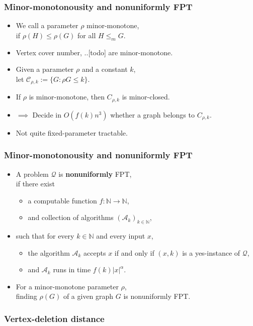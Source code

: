 \documentclass[t,usenames,dvipsnames]{beamer}
\begin{document}
\begin{frame} \frametitle{Minor-monotonousity and nonuniformly FPT}
	\begin{itemize}[<+->]
		\item We call a parameter $\rho$ minor-monotone,\\
			\hspace{1cm}if $\rho(H)\leq \rho(G)$ for all $H \leq_m G$.
		\item Vertex cover number, ..[todo] are minor-monotone.%
		\item Given a parameter $\rho$ and a constant $k$,\\
		\hspace{1cm}let $\mathcal{C}_{\rho, k} := \{G \colon \rho{G} \leq k\}$.
		\item If $\rho$ is minor-monotone, then $C_{\rho, k}$ is minor-closed.
		\item $\implies$ Decide in $O(f(k) n^3)$ whether a graph belongs to $C_{\rho, k}$.
		\item Not quite fixed-parameter tractable.
	\end{itemize}
\end{frame}
\begin{frame} \frametitle{Minor-monotonousity and nonuniformly FPT}
	\begin{itemize}[<+->]
		\item A problem $\mathcal{Q}$ is \textbf{nonuniformly} FPT,\\
			\hspace{1cm}if there exist
			\begin{itemize}
				\item a computable function $f:\mathbb{N}\rightarrow\mathbb{N}$,
				\item and collection of algorithms $(\mathcal{A}_k)_{k \in
					\mathbb{N}}$,
			\end{itemize}
		\item[] such that for every $k \in \mathbb{N}$ and every input $x$, 
		\begin{itemize}[<+->]
			\item the algorithm $\mathcal{A}_k$ accepts $x$ if and only if $(x,
				k)$ is a yes-instance of $\mathcal{Q}$,
			\item and $\mathcal{A}_k$ runs in time $f(k)|x|^{\alpha}$.
		\end{itemize}
	\item For a minor-monotone parameter $\rho$,\\
		\hspace{1cm}finding $\rho(G)$ of a given graph $G$ is nonuniformly FPT.
	\end{itemize}
	
\end{frame}
\begin{frame}\frametitle{Vertex-deletion distance}
\end{frame}
\end{document}
